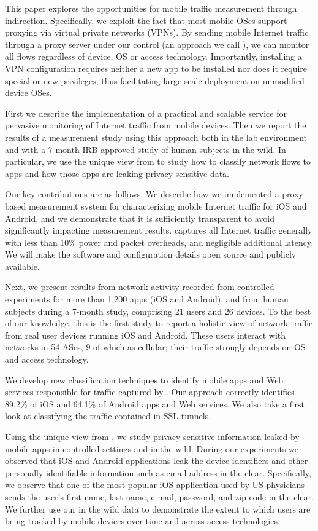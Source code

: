 This paper explores the opportunities for mobile traffic measurement through indirection. 
Specifically, we exploit the fact that most mobile OSes support proxying via virtual private networks (VPNs). 
By sending mobile Internet traffic through a proxy server under our control (an approach we call \platname), we can monitor all flows regardless of device, OS or access technology. 
Importantly, installing a VPN configuration requires neither a new app to be installed nor does it require special or new privileges, thus facilitating large-scale deployment on unmodified device OSes.

First we describe the implementation of a practical and scalable service for pervasive monitoring of 
Internet traffic from mobile devices.
Then we report the results of  a measurement study using this approach both in the lab environment and with a 7-month IRB-approved study of human subjects in the wild. In particular, we use the unique view from \platname to study how to classify network flows to apps and how those apps are leaking privacy-sensitive data.

Our key contributions are as follows. We describe how we implemented a proxy-based measurement system for characterizing mobile Internet traffic for iOS and Android, 
and we demonstrate that it is sufficiently transparent to avoid significantly impacting measurement results. 
\platname captures all Internet traffic generally with less than 10\% power and packet overheads, and negligible additional latency. 
We will make the \platname software and configuration details open source and publicly available.

Next, we present results from network activity recorded from controlled experiments for more than 1,200 apps (iOS and Android), 
and from human subjects during a 7-month study, comprising 21 users and 26 devices. To the best of our knowledge, this is the first study to report a holistic 
view of network traffic from real user devices running iOS and Android. These users interact with networks in 54 ASes, 9 of which as cellular; their traffic 
strongly depends on OS and access technology.

We develop new classification techniques to identify mobile apps and Web services responsible for traffic captured by \platname. Our approach correctly identifies 89.2\% of iOS and 64.1\% of Android apps and Web services. We also take a first look at classifying the traffic contained in SSL tunnels.

Using the unique view from \platname, we study privacy-sensitive information leaked by mobile apps in controlled settings and in the wild. During our experiments we observed that iOS and Android applications leak the device identifiers and other personally identifiable information such as email address in the clear. Specifically, we observe that one of the most popular iOS application used by US physicians sends the user's first name, last name, e-mail, password, and zip code in the clear. We further use our in the wild 
data to demonstrate the extent to which users are being tracked by mobile devices over time 
and across access technologies. 

